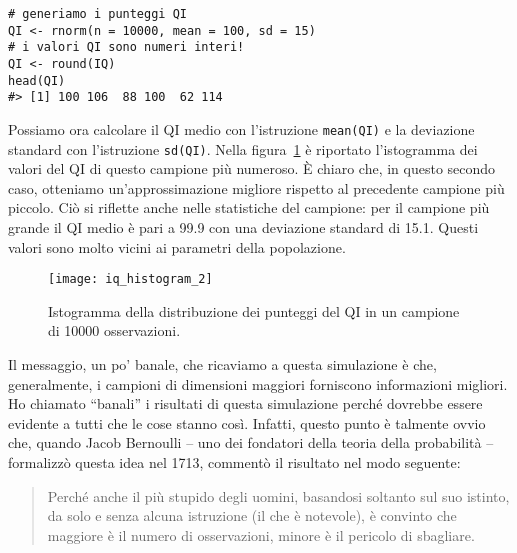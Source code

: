 \begin{lstlisting}
# generiamo i punteggi QI
QI <- rnorm(n = 10000, mean = 100, sd = 15) 
# i valori QI sono numeri interi!
QI <- round(IQ) 
head(QI)
#> [1] 100 106  88 100  62 114
\end{lstlisting}

Possiamo ora calcolare il QI medio con l'istruzione \verb+mean(QI)+ e la deviazione standard con l'istruzione \verb+sd(QI)+. 
Nella figura~\ref{fig:qi_hist_2} è riportato l'istogramma dei valori del QI di questo campione più numeroso.
È chiaro che, in questo secondo caso, otteniamo un'approssimazione migliore rispetto al  precedente campione più piccolo. 
Ciò si riflette anche nelle statistiche del campione: per il campione più grande il QI medio è pari a 99.9 con una deviazione standard di 15.1. 
Questi valori sono molto vicini ai parametri della popolazione.

\begin{figure}[h!]
\centering
\texttt{[image: iq\_histogram\_2]}
\caption{Istogramma della distribuzione dei punteggi del QI in un campione di \num{10000} osservazioni.}
\label{fig:qi_hist_2}
\end{figure}

Il messaggio, un po' banale, che ricaviamo a questa simulazione è che, generalmente, i campioni di dimensioni maggiori forniscono informazioni migliori. 
Ho chiamato \enquote{banali} i risultati di questa simulazione perché dovrebbe essere evidente a tutti che le cose stanno così.
Infatti, questo punto è talmente ovvio che, quando Jacob Bernoulli -- uno dei fondatori della teoria della probabilità -- formalizzò questa idea nel 1713, commentò il risultato nel modo seguente:

\begin{quote}
Perché anche il più stupido degli uomini, basandosi soltanto sul suo istinto, da solo e senza alcuna istruzione (il che è notevole), è convinto che maggiore è il numero di osservazioni, minore è il pericolo di sbagliare. 
\end{quote}


